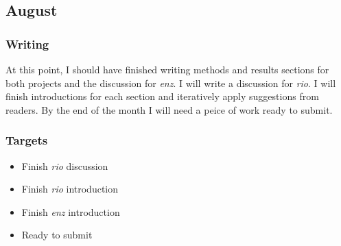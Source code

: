 \documentclass{article}
\begin{document}
\subsection{August}
\subsubsection{Writing}
At this point, I should have finished writing methods and results sections for both projects and the discussion for \textit{enz}. %
I will write a discussion for \textit{rio}. %
I will finish introductions for each section and iteratively apply suggestions from readers. %
By the end of the month I will need a peice of work ready to submit. %
\subsubsection{Targets}
\begin{itemize}
\item Finish \textit{rio} discussion
\item Finish \textit{rio} introduction
\item Finish \textit{enz} introduction
\item Ready to submit
\end{itemize}

\printbibliography
\end{document}
